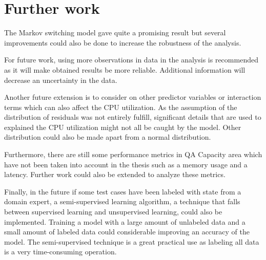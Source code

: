 \section{Further work}

The Markov switching model gave quite a promising result but several
improvements could also be done to increase the robustness of the
analysis. 

For future work, using more observations in data in the analysis is
recommended as it will make obtained results be more reliable. Additional
information will decrease an uncertainty in the data. 

Another future extension is to consider on other predictor variables
or interaction terms which can also affect the CPU utilization. As
the assumption of the distribution of residuals was not entirely fulfill,
significant details that are used to explained the CPU utilization
might not all be caught by the model. Other distribution could also
be made apart from a normal distribution. 

Furthermore, there are still some performance metrics in QA Capacity
area which have not been taken into account in the thesis such as
a memory usage and a latency. Further work could also be extended
to analyze these metrics.

Finally, in the future if some test cases have been labeled with state
from a domain expert, a semi-supervised learning algorithm, a technique
that falls between supervised learning and unsupervised learning,
could also be implemented. Training a model with a large amount of
unlabeled data and a small amount of labeled data could considerable
improving an accuracy of the model. The semi-supervised technique
is a great practical use as labeling all data is a very time-consuming
operation. 

\begin{comment}
This line indicates the amount of time the CPU spent in each of several
states, displayed as percentages. The numbers reflect the percentage
of the time since the last screen update that the CPU spent in each
state. 

Idle: Nothing to do
\end{comment}



